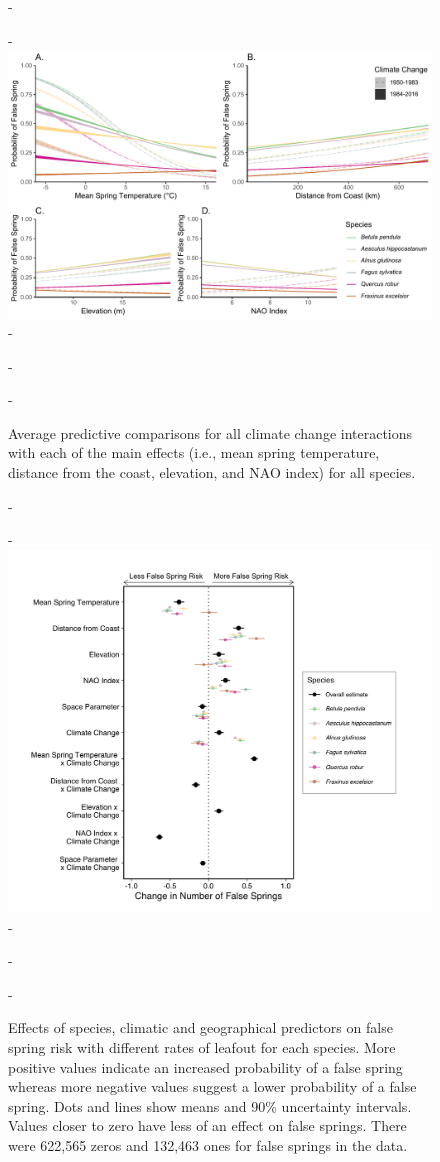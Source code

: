 \documentclass{article}\usepackage[]{graphicx}\usepackage[]{color}
\begin{document}
{\begin{figure} [H]
  -\begin{center}
  -\includegraphics[width=16cm]{..//analyses/figures/APC_allpred_allspp_baseR.pdf}
  -\caption{Average predictive comparisons for all climate change interactions with each of the main effects (i.e., mean spring temperature, distance from the coast, elevation, and NAO index) for all species. }\label{fig:suppapc}
  -\end{center}
  -\end{figure}}
  
  {\begin{figure} [H]
  -\begin{center}
  -\includegraphics[width=12cm]{..//analyses/figures/model_output_90_dvrspp.png}
  -\caption{Effects of species, climatic and geographical predictors on false spring risk with different rates of leafout for each species. More positive values indicate an increased probability of a false spring whereas more negative values suggest a lower probability of a false spring. Dots and lines show means and 90\% uncertainty intervals. Values closer to zero have less of an effect on false springs. There were 622,565 zeros and 132,463 ones for false springs in the data.}\label{fig:dvr}
  -\end{center}
  -\end{figure}}
  
\end{document}
